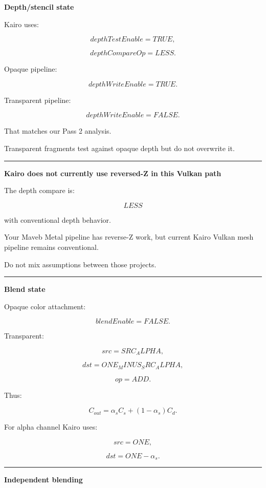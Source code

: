 \textbf{Depth/stencil state}

Kairo uses:

\[
depthTestEnable=TRUE,
\]

\[
depthCompareOp=LESS.
\]

Opaque pipeline:

\[
depthWriteEnable=TRUE.
\]

Transparent pipeline:

\[
depthWriteEnable=FALSE.
\]

That matches our Pass 2 analysis.

Transparent fragments test against opaque depth but do not overwrite it.

\begin{center}\rule{0.5\linewidth}{0.5pt}\end{center}

\textbf{Kairo does not currently use reversed-Z in this Vulkan path}

The depth compare is:

\[
LESS
\]

with conventional depth behavior.

Your Maveb Metal pipeline has reverse-Z work, but current Kairo Vulkan mesh pipeline remains conventional.

Do not mix assumptions between those projects.

\begin{center}\rule{0.5\linewidth}{0.5pt}\end{center}

\textbf{Blend state}

Opaque color attachment:

\[
blendEnable=FALSE.
\]

Transparent:

\[
src=SRC_ALPHA,
\]

\[
dst=ONE_MINUS_SRC_ALPHA,
\]

\[
op=ADD.
\]

Thus:

\[
C_{out}
=
\alpha_sC_s
+
(1-\alpha_s)C_d.
\]

For alpha channel Kairo uses:

\[
src=ONE,
\]

\[
dst=ONE-\alpha_s.
\]

\begin{center}\rule{0.5\linewidth}{0.5pt}\end{center}

\textbf{Independent blending}

